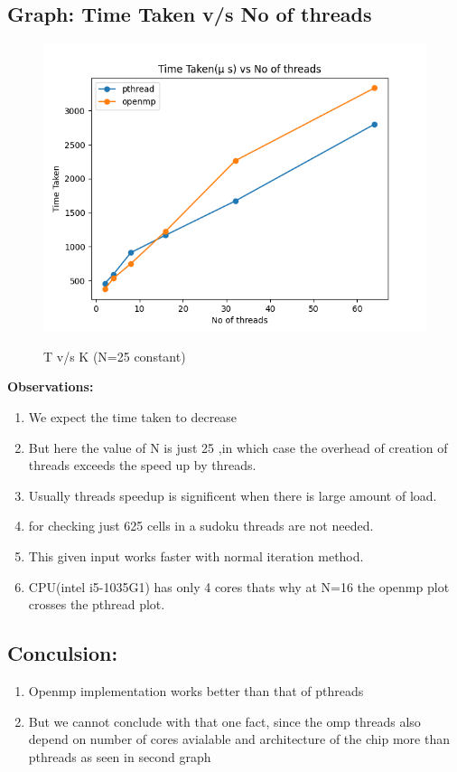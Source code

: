 \documentclass[10pt,a4paper]{article}
\begin{document}
\subsection{Graph: Time Taken v/s No of threads }
\begin{figure}[!ht]
\includegraphics[scale = 0.8]{plot_final_25}
\label{}
\caption{T v/s K (N=25 constant)}
\end{figure}
\textbf{Observations:}
\begin{enumerate}
\item We expect the time taken to decrease
\item But here the value of N is just 25 ,in which case the overhead of creation of threads exceeds the speed up by threads.
\item Usually threads speedup  is significent when there is large amount of load.
\item for checking just 625 cells in a sudoku threads are not needed.
\item This given input works faster with normal iteration method.
\item CPU(intel i5-1035G1) has only 4 cores thats why at N=16 the openmp plot crosses the pthread plot.
\end{enumerate}
\subsection{Conculsion:}
\begin{enumerate}
\item Openmp implementation works better than that of pthreads
\item But we cannot conclude with that one fact, since the omp threads also depend on number of cores avialable and architecture of the chip more than pthreads as seen in second graph
\end{enumerate}
\end{document}
